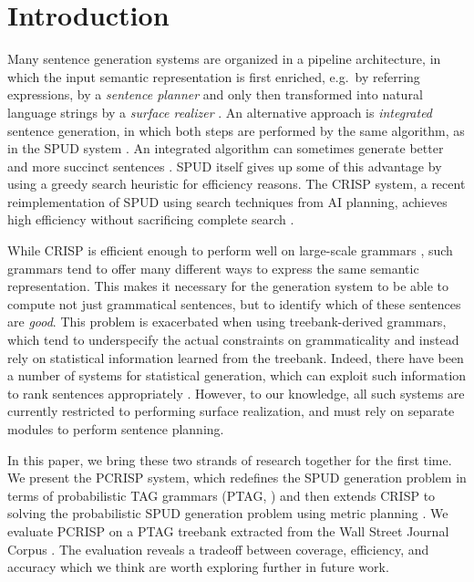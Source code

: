 \section{Introduction}

Many sentence generation systems are organized in a pipeline
architecture, in which the input semantic representation is first
enriched, e.g.\ by referring expressions, by a \emph{sentence
  planner} and only then transformed into natural language strings by
a \emph{surface realizer} \cite{reiterdale2000}.  An alternative
approach is \emph{integrated} sentence generation, in which both steps
are performed by the same algorithm, as in the SPUD system
\cite{Stone2003a}.  An integrated algorithm can sometimes generate
better and more succinct sentences \cite{stone98textual}.  SPUD itself
gives up some of this advantage by using a greedy search heuristic
for efficiency reasons.  The CRISP system, a recent reimplementation
of SPUD using search techniques from AI planning, achieves high
efficiency without sacrificing complete search
\cite{kollerstone2007,KolHof10}.

While CRISP is efficient enough to perform well on large-scale
grammars \cite{KolHof10}, such grammars tend to offer many
different ways to express the same semantic representation.  This
makes it necessary for the generation system to be able to compute not
just grammatical sentences, but to identify which of these sentences
are \emph{good}. This problem is exacerbated when using
treebank-derived grammars, which tend to underspecify the actual
constraints on grammaticality and instead rely on statistical
information learned from the treebank.  Indeed, there have been a
number of systems for statistical generation, which can exploit such
information to rank sentences appropriately
\cite{langkildeknight1998,whitebaldridge2003,belz2008}.  However, to our 
knowledge, all such systems are currently restricted to performing surface realization,
and must rely on separate modules to perform sentence planning.

In this paper, we bring these two strands of research together for the
first time.  We present the PCRISP system, which redefines the SPUD
generation problem in terms of probabilistic TAG grammars (PTAG,
\cite{resnik1992}) and then extends CRISP to solving the probabilistic
SPUD generation problem using metric planning \cite{fox2002,hoffmann2003}.  We
evaluate PCRISP on a PTAG treebank extracted from the Wall Street
Journal Corpus \cite{chenschanker2004}.  The evaluation reveals
a tradeoff between coverage, efficiency, and accuracy which we think
are worth exploring further in future work.

